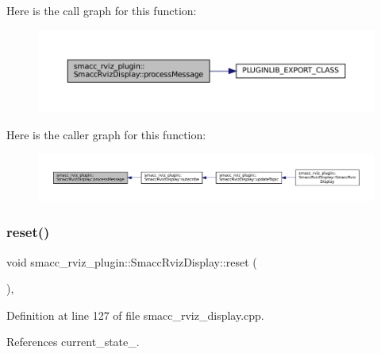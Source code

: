 Here is the call graph for this function\+:
\nopagebreak
\begin{figure}[H]
\begin{center}
\leavevmode
\includegraphics[width=350pt]{classsmacc__rviz__plugin_1_1SmaccRvizDisplay_acc7281b99c92fa89f7494f6ca53e4905_cgraph}
\end{center}
\end{figure}
Here is the caller graph for this function\+:
\nopagebreak
\begin{figure}[H]
\begin{center}
\leavevmode
\includegraphics[width=350pt]{classsmacc__rviz__plugin_1_1SmaccRvizDisplay_acc7281b99c92fa89f7494f6ca53e4905_icgraph}
\end{center}
\end{figure}
\mbox{\label{classsmacc__rviz__plugin_1_1SmaccRvizDisplay_af9cf4f5ef4f5fdb2fcb1bf1a81cdac4d}} 
\subsubsection{\texorpdfstring{reset()}{reset()}}
{\footnotesize\ttfamily void smacc\+\_\+rviz\+\_\+plugin\+::\+Smacc\+Rviz\+Display\+::reset (\begin{DoxyParamCaption}{ }\end{DoxyParamCaption})\hspace{0.3cm}{\ttfamily [protected]}, {\ttfamily [virtual]}}



Definition at line 127 of file smacc\+\_\+rviz\+\_\+display.\+cpp.



References current\+\_\+state\+\_\+.



